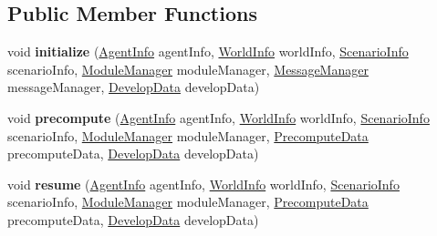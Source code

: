 \subsection*{Public Member Functions}
\begin{DoxyCompactItemize}
\item 
\hypertarget{classadf_1_1launcher_1_1dummy_1_1tactics_1_1DummyTacticsPolice_a7384f0a50e141e9e5469653aef5c35ff}{}\label{classadf_1_1launcher_1_1dummy_1_1tactics_1_1DummyTacticsPolice_a7384f0a50e141e9e5469653aef5c35ff} 
void {\bfseries initialize} (\hyperlink{classadf_1_1agent_1_1info_1_1AgentInfo}{Agent\+Info} agent\+Info, \hyperlink{classadf_1_1agent_1_1info_1_1WorldInfo}{World\+Info} world\+Info, \hyperlink{classadf_1_1agent_1_1info_1_1ScenarioInfo}{Scenario\+Info} scenario\+Info, \hyperlink{classadf_1_1agent_1_1module_1_1ModuleManager}{Module\+Manager} module\+Manager, \hyperlink{classadf_1_1agent_1_1communication_1_1MessageManager}{Message\+Manager} message\+Manager, \hyperlink{classadf_1_1agent_1_1develop_1_1DevelopData}{Develop\+Data} develop\+Data)
\item 
\hypertarget{classadf_1_1launcher_1_1dummy_1_1tactics_1_1DummyTacticsPolice_a977f1be5d6108747bca679798503c234}{}\label{classadf_1_1launcher_1_1dummy_1_1tactics_1_1DummyTacticsPolice_a977f1be5d6108747bca679798503c234} 
void {\bfseries precompute} (\hyperlink{classadf_1_1agent_1_1info_1_1AgentInfo}{Agent\+Info} agent\+Info, \hyperlink{classadf_1_1agent_1_1info_1_1WorldInfo}{World\+Info} world\+Info, \hyperlink{classadf_1_1agent_1_1info_1_1ScenarioInfo}{Scenario\+Info} scenario\+Info, \hyperlink{classadf_1_1agent_1_1module_1_1ModuleManager}{Module\+Manager} module\+Manager, \hyperlink{classadf_1_1agent_1_1precompute_1_1PrecomputeData}{Precompute\+Data} precompute\+Data, \hyperlink{classadf_1_1agent_1_1develop_1_1DevelopData}{Develop\+Data} develop\+Data)
\item 
\hypertarget{classadf_1_1launcher_1_1dummy_1_1tactics_1_1DummyTacticsPolice_ad28aac10568d4cc20e42ae501f6b9425}{}\label{classadf_1_1launcher_1_1dummy_1_1tactics_1_1DummyTacticsPolice_ad28aac10568d4cc20e42ae501f6b9425} 
void {\bfseries resume} (\hyperlink{classadf_1_1agent_1_1info_1_1AgentInfo}{Agent\+Info} agent\+Info, \hyperlink{classadf_1_1agent_1_1info_1_1WorldInfo}{World\+Info} world\+Info, \hyperlink{classadf_1_1agent_1_1info_1_1ScenarioInfo}{Scenario\+Info} scenario\+Info, \hyperlink{classadf_1_1agent_1_1module_1_1ModuleManager}{Module\+Manager} module\+Manager, \hyperlink{classadf_1_1agent_1_1precompute_1_1PrecomputeData}{Precompute\+Data} precompute\+Data, \hyperlink{classadf_1_1agent_1_1develop_1_1DevelopData}{Develop\+Data} develop\+Data)

\end{DoxyCompactItemize}
